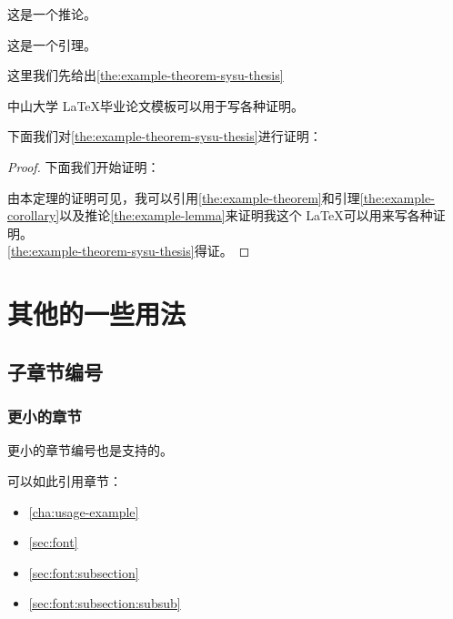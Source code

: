 \begin{corollary}[推论例子]
    \label{the:example-corollary}
    这是一个推论。
\end{corollary}

\begin{lemma}[引理例子]
    \label{the:example-lemma}
    这是一个引理。
\end{lemma}

这里我们先给出\autoref{the:example-theorem-sysu-thesis}

\begin{theorem}[中山大学毕业论文模板定理]
    \label{the:example-theorem-sysu-thesis}
    中山大学 \LaTeX 毕业论文模板\cite{sysu-thesis}可以用于写各种证明。
\end{theorem}

下面我们对\autoref{the:example-theorem-sysu-thesis}进行证明：


\begin{proof}

    下面我们开始证明：

    由本定理的证明可见，我可以引用\autoref{the:example-theorem}和引理\ref{the:example-corollary}以及推论\ref{the:example-lemma}来证明我这个 \LaTeX 可以用来写各种证明。 \\

    \autoref{the:example-theorem-sysu-thesis}得证。
\end{proof}


\section{其他的一些用法}
\label{sec:font}
\subsection{子章节编号}
\label{sec:font:subsection}
\subsubsection{更小的章节}
\label{sec:font:subsection:subsub}
更小的章节编号也是支持的。

可以如此引用章节：

\begin{itemize}
    \item \autoref{cha:usage-example}
    \item  \autoref{sec:font}
    \item  \autoref{sec:font:subsection}
    \item  \autoref{sec:font:subsection:subsub}
\end{itemize}


